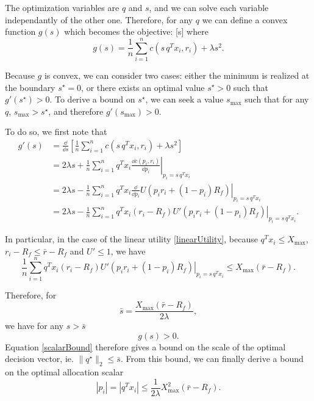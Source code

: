 The optimization variables are $q$ and $s$, and we can solve each variable independantly
of the other one. Therefore, for any $q$ we can define a convex function $g(s)$ which
becomes the objective: [s] where
\begin{equation*}
  g(s) = \frac{1}{n} \sum_{i=1}^n c(s\,q^T x_i, r_i) + \lambda s^2.
\end{equation*}

Because $g$ is convex, we can consider two cases: either the minimum is realized at the
boundary $s^\star=0$, or there exists an optimal value $s^\star > 0$ such that
$g'(s^\star) > 0$. To derive a bound on $s^\star$, we can seek a value $s_{\max}$ such
that for any $q$, $s_{\max} > s^\star$, and therefore $g'(s_{\max}) > 0$.

To do so, we first note that
\begin{align*}
    g'(s) &= \frac{\dd}{\dd s}\left[\frac{1}{n} \sum_{i=1}^n c(s\, q^{T}x_i, r_i) + \lambda s^2\right]\\
          &= 2\lambda s + \frac{1}{n} \sum_{i=1}^n q^{T}x_i \left. \frac{\dd c(p_i,r_i)}{\dd p_i} \right|_{p_i =
            s\,q^{T}x_i} \\
          &= 2\lambda s - \frac{1}{n} \sum_{i=1}^n q^{T}x_i \left. \frac{\dd}{\dd p_i} U(p_i r_i +
            (1-p_i)R_f) \right|_{p_i = s\,q^{T}x_i}\\
          &= 2\lambda s - \frac{1}{n} \sum_{i=1}^n q^{T}x_i (r_i-R_f) \left. U'(p_i r_i +
            (1-p_i)R_f) \right|_{p_i = s\,q^{T}x_i}.
\end{align*}

In particular, in the case of the linear utility \eqref{linearUtility}, because
$q^Tx_i\leq X_{\max}$, $r_i-R_f\leq \bar r - R_f$ and $U'\leq 1$, we have
\begin{equation*}
  \frac{1}{n} \sum_{i=1}^n q^{T}x_i (r_i-R_f) \left. U'(p_i r_i +
    (1-p_i)R_f) \right|_{p_i = s\,q^{T}x_i} \leq X_{\max}(\bar{r}-R_f).
\end{equation*}

Therefore, for
\begin{equation}
  \label{scalarBound}
  \bar s = \frac{X_{\max}(\bar r-R_f)}{2\lambda},
\end{equation}
we have for any $s>\bar s$
\begin{equation*}
  g(s) > 0.
\end{equation*}
Equation \eqref{scalarBound} therefore gives a bound on the scale of the optimal
decision vector, ie. $\|q^\star\|_2 \leq \bar s$. From this bound, we can finally derive a
bound on the optimal allocation scalar
\begin{equation}
  \label{allocationBound}
  |p_i| = |q^{T}x_i|\leq \frac{1}{2\lambda} X^2_{\max}(\bar r -R_f).
\end{equation}

